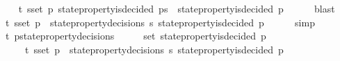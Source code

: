 \begin{isabellebody}
\ \ \isamarkupfalse%
\ {\isachardoublequoteopen}{\isasymexists}{\isasymsigma}{\isasymin}{\isasymSigma}t{\isachardot}\ {\isasymforall}s{\isasymin}{\isasymsigma}{\isacharunderscore}set{\isachardot}\ {\isacharparenleft}{\isasymforall}p{\isachardot}\ state{\isacharunderscore}property{\isacharunderscore}is{\isacharunderscore}decided\ {\isacharparenleft}p{\isacharcomma}s{\isacharparenright}\ {\isasymlongrightarrow}\ state{\isacharunderscore}property{\isacharunderscore}is{\isacharunderscore}decided\ {\isacharparenleft}p{\isacharcomma}{\isasymsigma}{\isacharparenright}{\isacharparenright}{\isachardoublequoteclose}\isanewline
\ \ \ \ \isamarkupfalse%
\ blast\isanewline
\ \ \isamarkupfalse%
\ {\isachardoublequoteopen}{\isasymexists}{\isasymsigma}{\isasymin}{\isasymSigma}t{\isachardot}\ {\isasymforall}s{\isasymin}{\isasymsigma}{\isacharunderscore}set{\isachardot}\ {\isacharparenleft}{\isasymforall}p\ {\isasymin}\ state{\isacharunderscore}property{\isacharunderscore}decisions\ s{\isachardot}\ state{\isacharunderscore}property{\isacharunderscore}is{\isacharunderscore}decided\ {\isacharparenleft}p{\isacharcomma}{\isasymsigma}{\isacharparenright}{\isacharparenright}{\isachardoublequoteclose}\isanewline
\ \ \ \ \isamarkupfalse%
\ simp\isanewline
\ \ \isamarkupfalse%
\ {\isachardoublequoteopen}{\isasymexists}{\isasymsigma}{\isasymin}{\isasymSigma}t{\isachardot}\ {\isasymforall}p{\isasymin}{\isasymUnion}{\isacharbraceleft}state{\isacharunderscore}property{\isacharunderscore}decisions\ {\isasymsigma}\ {\isacharbar}\ {\isasymsigma}{\isachardot}\ {\isasymsigma}\ {\isasymin}\ {\isasymsigma}{\isacharunderscore}set{\isacharbraceright}{\isachardot}\ state{\isacharunderscore}property{\isacharunderscore}is{\isacharunderscore}decided\ {\isacharparenleft}p{\isacharcomma}{\isasymsigma}{\isacharparenright}{\isachardoublequoteclose}\isanewline
\ \ \isamarkupfalse%
{\isacharminus}\isanewline
\ \ \ \ \isamarkupfalse%
\ {\isasymsigma}\ \ {\isachardoublequoteopen}{\isasymsigma}\ {\isasymin}\ {\isasymSigma}t{\isachardoublequoteclose}\ {\isachardoublequoteopen}{\isasymforall}s{\isasymin}{\isasymsigma}{\isacharunderscore}set{\isachardot}\ {\isacharparenleft}{\isasymforall}p\ {\isasymin}\ state{\isacharunderscore}property{\isacharunderscore}decisions\ s{\isachardot}\ state{\isacharunderscore}property{\isacharunderscore}is{\isacharunderscore}decided\ {\isacharparenleft}p{\isacharcomma}{\isasymsigma}{\isacharparenright}{\isacharparenright}{\isachardoublequoteclose}\isanewline

\end{isabellebody}
